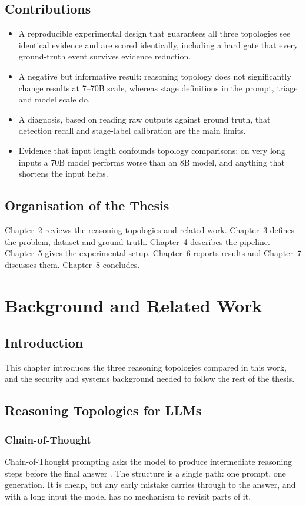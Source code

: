 \documentclass[a4paper, 12pt]{report}
\theoremstyle{definition}
\begin{document}
\section{Contributions}
\begin{itemize}
	\item A reproducible experimental design that guarantees all three topologies see identical evidence and are scored identically, including a hard gate that every ground-truth event survives evidence reduction.
	\item A negative but informative result: reasoning topology does not significantly change results at 7--70B scale, whereas stage definitions in the prompt, triage and model scale do.
	\item A diagnosis, based on reading raw outputs against ground truth, that detection recall and stage-label calibration are the main limits.
	\item Evidence that input length confounds topology comparisons: on very long inputs a 70B model performs worse than an 8B model, and anything that shortens the input helps.
\end{itemize}

\section{Organisation of the Thesis}
Chapter~2 reviews the reasoning topologies and related work. Chapter~3 defines the problem, dataset and ground truth. Chapter~4 describes the pipeline. Chapter~5 gives the experimental setup. Chapter~6 reports results and Chapter~7 discusses them. Chapter~8 concludes.

\chapter{Background and Related Work}
\label{chap.2}
\section{Introduction}
This chapter introduces the three reasoning topologies compared in this work, and the security and systems background needed to follow the rest of the thesis.

\section{Reasoning Topologies for LLMs}
\subsection{Chain-of-Thought}
Chain-of-Thought prompting asks the model to produce intermediate reasoning steps before the final answer \cite{wei2022cot}. The structure is a single path: one prompt, one generation. It is cheap, but any early mistake carries through to the answer, and with a long input the model has no mechanism to revisit parts of it.
\end{document}
